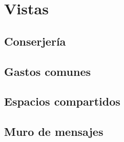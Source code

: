 \chapter{Vistas}
\section{Conserjería}
\section{Gastos comunes}
\section{Espacios compartidos}
\section{Muro de mensajes}